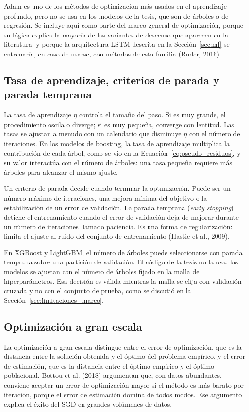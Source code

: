 Adam es uno de los métodos de optimización más usados en el aprendizaje profundo, pero no se usa en los modelos de la tesis, que son de árboles o de regresión. Se incluye aquí como parte del marco general de optimización, porque su lógica explica la mayoría de las variantes de descenso que aparecen en la literatura, y porque la arquitectura LSTM descrita en la Sección~\ref{sec:ml} se entrenaría, en caso de usarse, con métodos de esta familia (Ruder, 2016).

\subsection{Tasa de aprendizaje, criterios de parada y parada temprana}
La tasa de aprendizaje $\eta$ controla el tamaño del paso. Si es muy grande, el procedimiento oscila o diverge; si es muy pequeña, converge con lentitud. Las tasas se ajustan a menudo con un calendario que disminuye $\eta$ con el número de iteraciones. En los modelos de boosting, la tasa de aprendizaje multiplica la contribución de cada árbol, como se vio en la Ecuación~\eqref{eq:pseudo_residuos}, y su valor interactúa con el número de árboles: una tasa pequeña requiere más árboles para alcanzar el mismo ajuste.

Un criterio de parada decide cuándo terminar la optimización. Puede ser un número máximo de iteraciones, una mejora mínima del objetivo o la estabilización de un error de validación. La parada temprana (\textit{early stopping}) detiene el entrenamiento cuando el error de validación deja de mejorar durante un número de iteraciones llamado paciencia. Es una forma de regularización: limita el ajuste al ruido del conjunto de entrenamiento (Hastie et al., 2009).

En XGBoost y LightGBM, el número de árboles puede seleccionarse con parada temprana sobre una partición de validación. El código de la tesis no la usa: los modelos se ajustan con el número de árboles fijado en la malla de hiperparámetros. Esa decisión es válida mientras la malla se elija con validación cruzada y no con el conjunto de prueba, como se discutió en la Sección~\ref{sec:limitaciones_marco}.

\subsection{Optimización a gran escala}
La optimización a gran escala distingue entre el error de optimización, que es la distancia entre la solución obtenida y el óptimo del problema empírico, y el error de estimación, que es la distancia entre el óptimo empírico y el óptimo poblacional. Bottou et al. (2018) argumentan que, con datos abundantes, conviene aceptar un error de optimización mayor si el método es más barato por iteración, porque el error de estimación domina de todos modos. Ese argumento explica el éxito del SGD en grandes volúmenes de datos.

